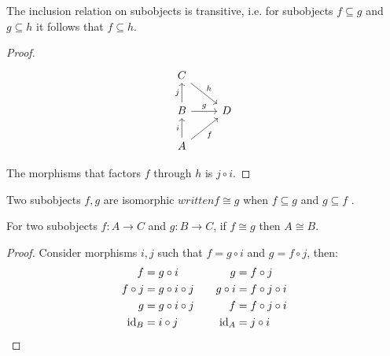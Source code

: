 \begin{theorem}
  The inclusion relation on subobjects is transitive, i.e. for subobjects $f\subseteq g$ and $g\subseteq h$ it follows that $f\subseteq h$.

  \begin{proof}
    \[\begin{tikzcd}[ampersand replacement=\&]
      C \\
      B \& D \\
      A
      \arrow["f"', from=3-1, to=2-2]
      \arrow["g", from=2-1, to=2-2]
      \arrow["i", from=3-1, to=2-1]
      \arrow["h", from=1-1, to=2-2]
      \arrow["j", from=2-1, to=1-1]
    \end{tikzcd}\]

    The morphisms that factors $f$ through $h$ is $j\circ i$.
  \end{proof}
\end{theorem}

\begin{definition}\label{def:iso_subobjects}
  Two subobjects $f,g$ are isomorphic $written f\cong g$ when $f\subseteq g$ and
  $g\subseteq f$ \parencite[p.~77]{goldblatt:topoi}.
\end{definition}

\begin{theorem}
  For two subobjects $f:A\to C$ and $g:B\to C$, if $f\cong g$ then $A\cong B$.

  \begin{proof}
    Consider morphisms $i, j$ such that $f=g\circ i$ and $g=f\circ j$, then:
    \[
      \begin{aligned}
        f &= g\circ i\\
        f\circ j &= g \circ i \circ j\\
        g &= g \circ i \circ j\\
        \mathrm{id}_B &= i \circ j
      \end{aligned}
      \qquad
      \begin{aligned}
        g &= f\circ j\\
        g\circ i &= f \circ j \circ i\\
        f &= f \circ j \circ i\\
        \mathrm{id}_A &= j \circ i
      \end{aligned}
    \]
  \end{proof}
\end{theorem}

